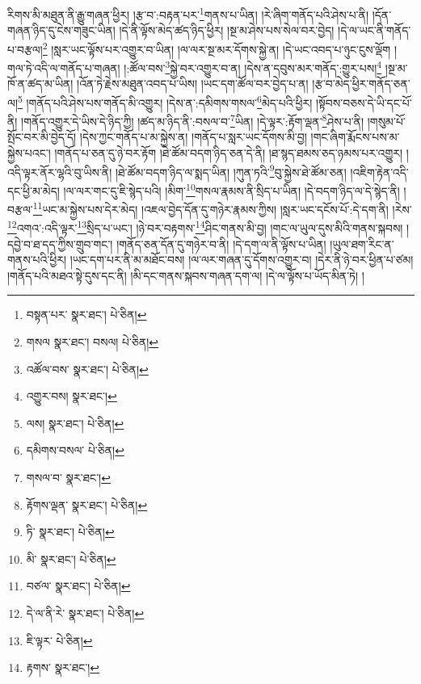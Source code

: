 རིགས་མི་མཐུན་ནི་རྒྱུ་གཞན་ཕྱིར། །རྩ་བ་:བརྟན་པར་\footnote{བསྟན་པར་  སྣར་ཐང་།  པེ་ཅིན། }གནས་པ་ཡིན། །རེ་ཞིག་གནོད་པའི་ཤེས་པ་ནི། །དོན་གཞན་ཉིད་དུ་ངེས་གཟུང་ཡིན། །དེ་ནི་ལྟོས་མེད་ཚད་ཉིད་ཕྱིར། །སྔ་མ་ཤེས་པས་སེལ་བར་བྱེད། །དེ་ལ་ཡང་ནི་གནོད་པ་བརྩལ།\footnote{གསལ  སྣར་ཐང་། བསལ།  པེ་ཅིན། } །སླར་ཡང་ལྟོས་པར་འགྱུར་བ་ཡིན། །ལ་ལར་སྔ་མར་དོགས་སྐྱེ་ན། །དེ་ཡང་འབད་པ་ཉུང་ངུས་ལྡོག །གལ་ཏེ་འདི་ལ་གནོད་པ་གཞན། །:ཚོལ་བས་\footnote{འཚོལ་བས་  སྣར་ཐང་།  པེ་ཅིན། }སྐྱེ་བར་འགྱུར་བ་ན། །དེས་ན་དབུས་མར་གནོད་:གྱུར་པས།\footnote{འགྱུར་བས།  སྣར་ཐང་། } །སྔ་མ་ཁོ་ན་ཚད་མ་ཡིན། །འོན་ཏེ་རྗེས་མཐུན་འབད་པ་ཡིས། །ཡང་དག་ཚོལ་བར་བྱེད་པ་ན། །རྩ་བ་མེད་ཕྱིར་གནོད་ཅན་ལ།\footnote{ལས།  སྣར་ཐང་།  པེ་ཅིན། } །གནོད་པའི་ཤེས་པས་གནོད་མི་འགྱུར། །དེས་ན་:དམིགས་གསལ་\footnote{དམིགས་བསལ་  པེ་ཅིན། }མེད་པའི་ཕྱིར། །སྟོབས་བཅས་དེ་ཡི་དང་པོ་ནི། །གནོད་འགྱུར་དེ་ཡིས་དེ་ཉིད་ཀྱི། །ཚད་མ་ཉིད་ནི་:བསལ་བ་\footnote{གསལ་བ་  སྣར་ཐང་། }ཡིན། །དེ་ལྟར་:རྟོག་ལྡན་\footnote{རྟོགས་ལྡན་  སྣར་ཐང་།  པེ་ཅིན། }ཤེས་པ་ནི། །གསུམ་པོ་སྤོང་བར་མི་བྱེད་དོ། །དེས་ཀྱང་གནོད་པ་མ་སྐྱེས་ན། །གནོད་པ་སླར་ཡང་དོགས་མི་བྱ། །གང་ཞིག་རྨོངས་པས་མ་སྐྱེས་པའང་། །གནོད་པ་ཅན་དུ་ཉེ་བར་རྟོག །ཐེ་ཚོམ་བདག་ཉིད་ཅན་དེ་ནི། །ཐ་སྙད་ཐམས་ཅད་ཉམས་པར་འགྱུར། །འདི་ལྟར་ནོར་ལྷའི་བུ་ཡིས་ནི། །ཐེ་ཚོམ་བདག་ཉིད་ལ་སྨད་ཡིན། །ཀུན་ཏའི་\footnote{ཏི་  སྣར་ཐང་།  པེ་ཅིན། }བུ་སྐྱེས་ཐེ་ཚོམ་ཅན། །འཇིག་རྟེན་འདི་དང་ཕྱི་མ་མེད། །ལ་ལར་གང་དུ་ཇི་སྙེད་པའི། །མིག་\footnote{མི་  སྣར་ཐང་།  པེ་ཅིན། }གསལ་རྣམས་ནི་སྲིད་པ་ཡིན། །དེ་བདག་ཉིད་ལ་དེ་སྙེད་ནི། །བརྩལ་\footnote{བཙལ་  སྣར་ཐང་།  པེ་ཅིན། }ཡང་མ་སྐྱེས་པས་དེར་མེད། །འཇལ་བྱེད་དོན་དུ་གཉེར་རྣམས་ཀྱིས། །སླར་ཡང་དངོས་པོ་:དེ་དག་ནི། །རེས་\footnote{དེ་ལ་ནི་རེ་  སྣར་ཐང་།  པེ་ཅིན། }འགའ་:འདི་ལྟར་\footnote{ཇི་ལྟར་  པེ་ཅིན། }སྲིད་པ་ཡང་། །ཉེ་བར་བརྟགས་\footnote{རྟགས་  སྣར་ཐང་། }ཤིང་གནས་མི་བྱ། །གང་ལ་ཡུལ་དུས་མིའི་གནས་སྐབས། །དབྱེ་བ་ཐ་དད་ཀྱིས་གྲུབ་གང་། །གནོད་ཅན་དོན་དུ་གཉེར་བ་ནི། །དེ་དག་ལ་ནི་ལྟོས་པ་ཡིན། །ཡུལ་ཐག་རིང་ན་གནས་པའི་ཕྱིར། །ཡང་དག་པར་ནི་མ་མཐོང་བས། །ལ་ལར་གཞན་དུ་དོགས་འགྱུར་བ། །དེར་ནི་ཉེ་བར་ཕྱིན་པ་ཙམ། །གནོད་པའི་མཐའ་སྟེ་དུས་དང་ནི། །མི་དང་གནས་སྐབས་གཞན་དག་ལ། །དེ་ལ་ལྟོས་པ་ཡོད་མིན་ཏེ། །
